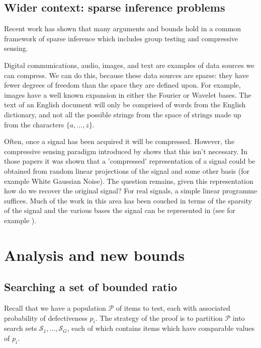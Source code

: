 \documentclass[conference]{IEEEtran}
\newcommand{\setS}{{\mathcal{S}}}
\newcommand{\setP}{{\mathcal{P}}}
\begin{document}
\subsection{Wider context: sparse inference problems}

Recent work \cite{aksoylar,tan} has shown that many arguments and bounds hold in a common framework of sparse inference
which includes group testing and compressive sensing.

Digital communications, audio, images, and text are examples of data sources we can compress. We can do this, because these data sources are sparse: they have fewer degrees of freedom than the space they are defined upon. 
For example, images have a well known expansion in either the Fourier or Wavelet bases. The text of an English document will only be comprised of words from the English dictionary, and not all the possible strings from the space of strings made up from the characters \(\{a, \ldots, z \}\). 

Often, once a signal has been acquired it will be compressed. However, the compressive sensing paradigm introduced by
\cite{candes,donoho2} shows that this isn't necessary. In those papers it was shown that a 'compressed' representation of a signal could be obtained from random linear projections of the signal and some other basis (for example White Gaussian Noise). The question remains, given this representation how do we recover the original signal? For real signals, a simple linear programme suffices.
Much of the work in this area has been couched in terms of the sparsity of the signal and the various bases the signal can be represented in (see for example \cite{candes,donoho2}). 


\section{Analysis and new bounds}

\subsection{Searching a set of bounded ratio} \label{sec:boundedratio}

Recall that we have a population $\setP$ of items to test, each with associated probability of defectiveness $p_i$.
The strategy of the proof is to partition $\setP$ 
 into search sets $\setS_1, \ldots, \setS_G$, each of which contains items which have
comparable values of $p_i$.
\end{document}
